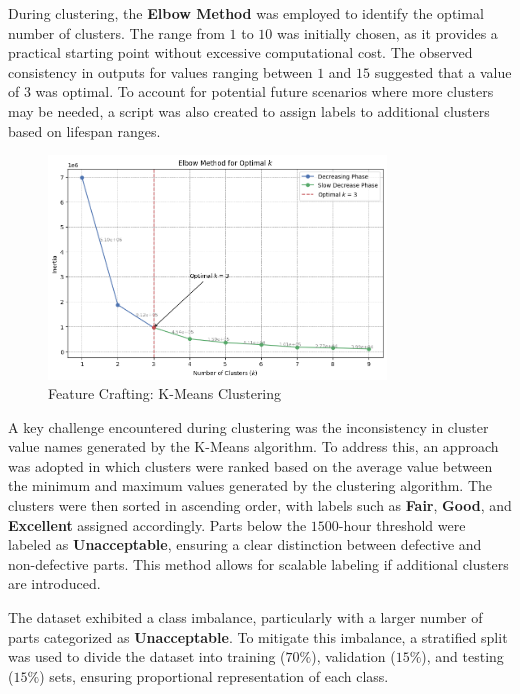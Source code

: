 \documentclass{article}
\begin{document}
During clustering, the \textbf{Elbow Method} was employed to identify the optimal number of clusters. The range from $1$ to $10$ was initially chosen, as it provides a practical starting point without excessive computational cost. The observed consistency in outputs for values ranging between $1$ and $15$ suggested that a value of $3$ was optimal. To account for potential future scenarios where more clusters may be needed, a script was also created to assign labels to additional clusters based on lifespan ranges.

\begin{figure}[htbp]
    \centering
    \includegraphics[width=0.8\textwidth]{./Images/FeatureCrafting-KMeanClustering.png}
    \caption{Feature Crafting: K-Means Clustering}
    \label{fig:feature_crafting_kmeans}
\end{figure}

A key challenge encountered during clustering was the inconsistency in cluster value names generated by the K-Means algorithm. To address this, an approach was adopted in which clusters were ranked based on the average value between the minimum and maximum values generated by the clustering algorithm. The clusters were then sorted in ascending order, with labels such as \textbf{Fair}, \textbf{Good}, and \textbf{Excellent} assigned accordingly. Parts below the $1500$-hour threshold were labeled as \textbf{Unacceptable}, ensuring a clear distinction between defective and non-defective parts. This method allows for scalable labeling if additional clusters are introduced.

The dataset exhibited a class imbalance, particularly with a larger number of parts categorized as \textbf{Unacceptable}. To mitigate this imbalance, a stratified split was used to divide the dataset into training ($70\%$), validation ($15\%$), and testing ($15\%$) sets, ensuring proportional representation of each class.
\end{document}
